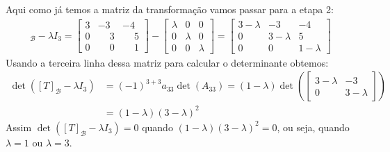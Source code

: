 \begin{exemplo}
\begin{enumerate}[label={\arabic*})]
\begin{solucao}
            Aqui como já temos a matriz da transformação vamos passar para a etapa 2:
            \begin{align*}
                [T]_\mathcal{B} - \lambda I_3 = \begin{bmatrix}3 & -3 & -4\\0 & \phantom{-}3 & \phantom{-}5\\0 & \phantom{-}0 &
                    \phantom{-}1\end{bmatrix} - \begin{bmatrix} \lambda & 0 & 0\\0 & \lambda & 0\\0 & 0 & \lambda\end{bmatrix} =
                    \begin{bmatrix}3 - \lambda & -3 & -4\\0 & 3 - \lambda & 5\\0 & 0 &1 - \lambda\end{bmatrix}
            \end{align*}
            Usando a terceira linha dessa matriz para calcular o determinante obtemos:
            \begin{align*}
                \det([T]_\mathcal{B} - \lambda I_3) &= (-1)^{3 + 3}a_{33}\det(A_{33}) = (1 - \lambda)\det\left(\begin{bmatrix}3 -
                \lambda & -3\\0 & 3 - \lambda\end{bmatrix}\right) \\ &= (1 - \lambda)(3 - \lambda)^2
            \end{align*}
            Assim $\det([T]_\mathcal{B} - \lambda I_3) = 0$ quando $(1 - \lambda)(3 - \lambda)^2 = 0$, ou seja, quando $\lambda = 1$
            ou $\lambda = 3$.


\end{solucao}
\end{enumerate}
\end{exemplo}
